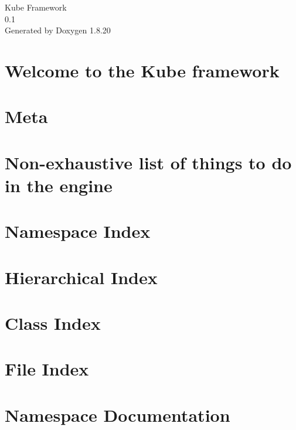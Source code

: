 \let\mypdfximage\pdfximage\def\pdfximage{\immediate\mypdfximage}\documentclass[twoside]{book}
\newcommand{\+}{\discretionary{\mbox{\scriptsize$\hookleftarrow$}}{}{}}
\newcommand{\clearemptydoublepage}{%
  \newpage{\pagestyle{empty}\cleardoublepage}%
}
\begin{document}
\hypersetup{pageanchor=false,
             bookmarksnumbered=true,
             pdfencoding=unicode
            }
\begin{titlepage}
\vspace*{7cm}
\begin{center}%
{\Large Kube Framework \\[1ex]\large 0.\+1 }\\
\vspace*{1cm}
{\large Generated by Doxygen 1.8.20}\\
\end{center}
\end{titlepage}
\clearemptydoublepage
{}
\tableofcontents
\clearemptydoublepage
{}
\hypersetup{pageanchor=true}

\chapter{Welcome to the Kube framework}
\label{index}\hypertarget{index}{}
\chapter{Meta}
\label{md__meta}

\chapter{Non-\/exhaustive list of things to do in the engine}
\label{md__t_o_d_o}

\chapter{Namespace Index}

\chapter{Hierarchical Index}

\chapter{Class Index}

\chapter{File Index}

\chapter{Namespace Documentation}











\end{document}

